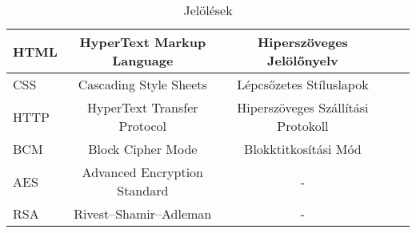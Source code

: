 \begin{table}[h!]
\begin{tabular}{ | l | c | c | c | c |}
		\hline
		HTML & HyperText Markup Language & Hiperszöveges Jelölőnyelv \\
		\hline
		CSS & Cascading Style Sheets & Lépcsőzetes Stíluslapok \\
		\hline
		HTTP & HyperText Transfer Protocol & Hiperszöveges Szállítási Protokoll \\
		\hline
		BCM & Block Cipher Mode & Blokktitkosítási Mód \\
		\hline
		AES & Advanced Encryption Standard & - \\
		\hline
		RSA & Rivest–Shamir–Adleman & - \\
		\hline
		\end{tabular}
		\caption{Jelölések}
		\label{tablazat1}
\end{table}